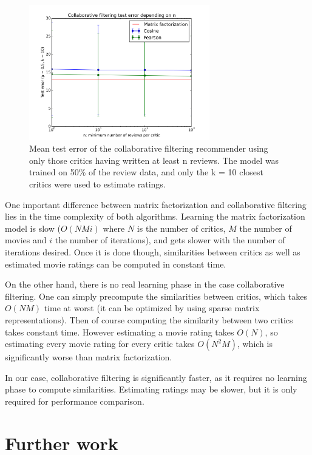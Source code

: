 \documentclass[12pt]{article}
\begin{document}
\begin{figure}[H]
\centering
\includegraphics[width=0.7\textwidth]{../plots/collab/graph_n.png}
\caption{Mean test error of the collaborative filtering recommender using only
    those critics having written at least n reviews. The model was trained on
    50\% of the review data, and only the k = 10 closest critics were used to
    estimate ratings.}
\label{fig:collab_n}
\end{figure}

One important difference between matrix factorization and collaborative
filtering lies in the time complexity of both algorithms. Learning the matrix
factorization model is slow ($O(NMi)$ where $N$ is the number of critics, $M$
the number of movies and $i$ the number of iterations), and gets slower with
the number of iterations desired. Once it is done though, similarities between
critics as well as estimated movie ratings can be computed in constant time.

On the other hand, there is no real learning phase in the case collaborative
filtering. One can simply precompute the similarities between critics, which
takes $O(NM)$ time at worst (it can be optimized by using sparse matrix
representations). Then of course computing the similarity between two critics
takes constant time. However estimating a movie rating takes $O(N)$, so
estimating every movie rating for every critic takes $O(N^2M)$, which is
significantly worse than matrix factorization.

In our case, collaborative filtering is significantly faster, as it requires no
learning phase to compute similarities. Estimating ratings may be slower, but
it is only required for performance comparison.

\section{Further work}
\end{document}
